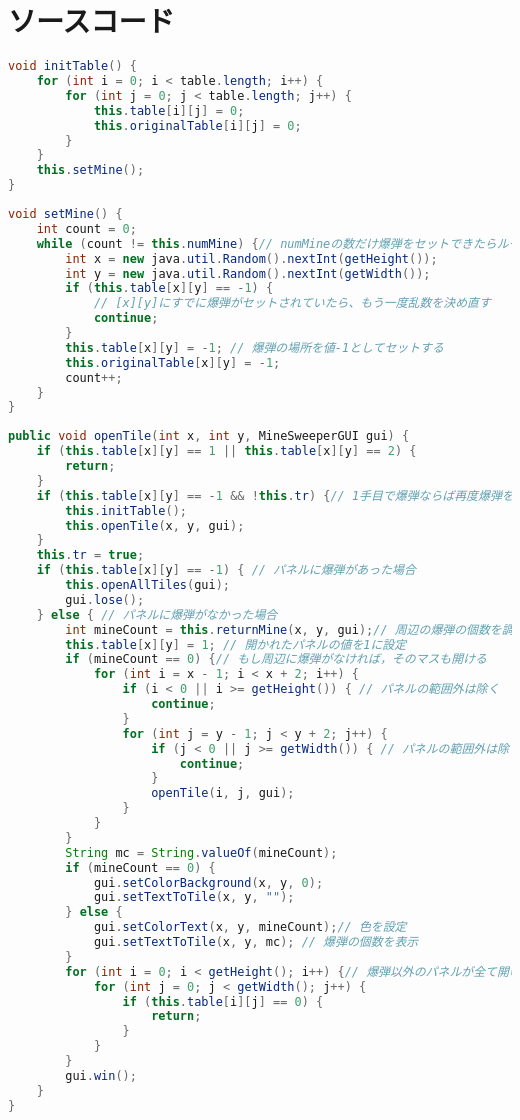 \documentclass[a4j,11pt]{jsarticle}
\begin{document}
\part{ソースコード}\label{sec:ソースコード}
\noindent{}
\lstset{frame=shadowbox,numbers=left}
\begin{lstlisting}[caption=\ttfamily initTable, label=src:initTable, language=Java]
void initTable() {
    for (int i = 0; i < table.length; i++) {
        for (int j = 0; j < table.length; j++) {
            this.table[i][j] = 0;
            this.originalTable[i][j] = 0;
        }
    }
    this.setMine();
}    
\end{lstlisting}
\begin{lstlisting}[caption=\ttfamily setMine, label=src:setMine, language=Java]
void setMine() {
    int count = 0;
    while (count != this.numMine) {// numMineの数だけ爆弾をセットできたらループを抜ける
        int x = new java.util.Random().nextInt(getHeight());
        int y = new java.util.Random().nextInt(getWidth());
        if (this.table[x][y] == -1) {
            // [x][y]にすでに爆弾がセットされていたら、もう一度乱数を決め直す
            continue;
        }
        this.table[x][y] = -1; // 爆弾の場所を値-1としてセットする
        this.originalTable[x][y] = -1;
        count++;
    }
}
\end{lstlisting}
\begin{lstlisting}[caption=\ttfamily openTile, label=src:openTile, language=Java]
public void openTile(int x, int y, MineSweeperGUI gui) {
	if (this.table[x][y] == 1 || this.table[x][y] == 2) {
		return;
	}
	if (this.table[x][y] == -1 && !this.tr) {// 1手目で爆弾ならば再度爆弾をセット
		this.initTable();
		this.openTile(x, y, gui);
	}
	this.tr = true;
	if (this.table[x][y] == -1) { // パネルに爆弾があった場合
		this.openAllTiles(gui);
		gui.lose();
	} else { // パネルに爆弾がなかった場合
		int mineCount = this.returnMine(x, y, gui);// 周辺の爆弾の個数を調査
		this.table[x][y] = 1; // 開かれたパネルの値を1に設定
		if (mineCount == 0) {// もし周辺に爆弾がなければ，そのマスも開ける
			for (int i = x - 1; i < x + 2; i++) {
				if (i < 0 || i >= getHeight()) { // パネルの範囲外は除く
					continue;
				}
				for (int j = y - 1; j < y + 2; j++) {
					if (j < 0 || j >= getWidth()) { // パネルの範囲外は除く
						continue;
					}
					openTile(i, j, gui);
				}
			}
		}
		String mc = String.valueOf(mineCount);
		if (mineCount == 0) {
			gui.setColorBackground(x, y, 0);
			gui.setTextToTile(x, y, "");
		} else {
			gui.setColorText(x, y, mineCount);// 色を設定
			gui.setTextToTile(x, y, mc); // 爆弾の個数を表示
		}
		for (int i = 0; i < getHeight(); i++) {// 爆弾以外のパネルが全て開いているか確認
			for (int j = 0; j < getWidth(); j++) {
				if (this.table[i][j] == 0) {
					return;
				}
			}
		}
		gui.win();
	}
}
\end{lstlisting}
\end{document}
